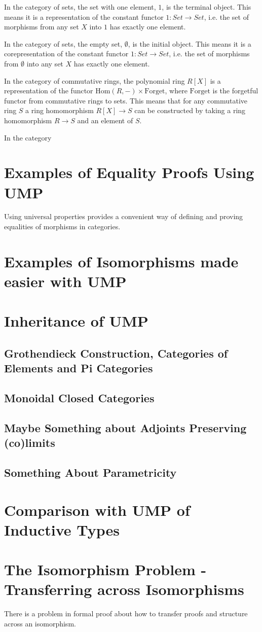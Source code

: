 \documentclass[12pt]{article} %
\theoremstyle{definition}
\theoremstyle{definition}
\theoremstyle{definition}
\theoremstyle{definition}
\begin{document}
In the category of sets, the set with one element, $1$, is the terminal object. This means it is a representation
of the constant functor $1 : Set \to Set$, i.e. the set of morphisms from any set $X$ into $1$ has exactly
one element.

In the category of sets, the empty set, $\emptyset$, is the initial object. This means it is a corepresentation
of the constant functor $1 : Set \to Set$, i.e. the set of morphisms from $\emptyset$ into any set $X$ has
exactly one element.

In the category of commutative rings, the polynomial ring $R[X]$ is a representation of the functor
$\text{Hom}(R, -) \times \text{Forget}$, where $\text{Forget}$ is the forgetful
functor from commutative rings to sets. This means that for any commutative ring $S$ a ring homomorphism
$R[X] \to S$ can be constructed by taking a ring homomorphism $R \to S$ and an element of $S$.

In the category


\section{Examples of Equality Proofs Using UMP}

Using universal properties provides a convenient way of defining and proving equalities of morphisms in
categories.

\section{Examples of Isomorphisms made easier with UMP}


\section{Inheritance of UMP}

\subsection{Grothendieck Construction, Categories of Elements and Pi Categories}

\subsection{Monoidal Closed Categories}

\subsection{Maybe Something about Adjoints Preserving (co)limits}

\subsection{Something About Parametricity}

\section{Comparison with UMP of Inductive Types}

\section{The Isomorphism Problem - Transferring across Isomorphisms}

There is a problem in formal proof about how to transfer proofs and structure across an isomorphism.
\end{document}
